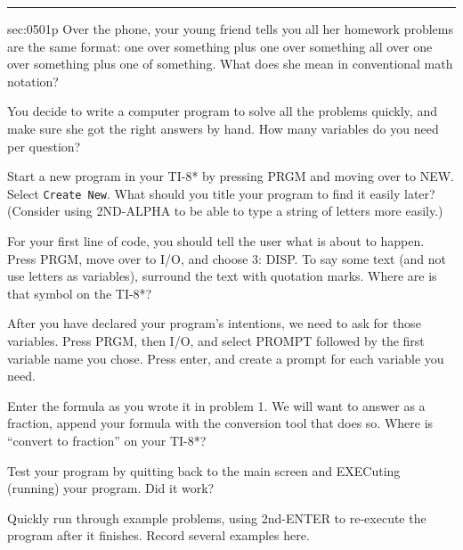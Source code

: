 \renewcommand{\columnseprule}{1.5pt}
\begin{multicols*}{2}
\rule[0.5\baselineskip]{0.4\textwidth}{1pt}
\noindent
{}\label{sec:0501p}
\begin{exercises}{sec:0501p}
\lab{} Over the phone, your young friend tells you all her homework problems are the same format: one over something plus one over something all over one over something plus one of something.  What does she mean in conventional math notation?

\vspace{2cm}
\lab{} You decide to write a computer program to solve all the problems quickly, and make sure she got the right answers by hand.  How many variables do you need per question?

\vspace{2cm}
\lab{} Start a new program in your TI-8* by pressing PRGM and moving over to NEW.  Select \texttt{Create New}.  What should you title your program to find it easily later?  (Consider using 2ND-ALPHA to be able to type a string of letters more easily.)

\vspace{2cm}
\lab{} For your first line of code, you should tell the user what is about to happen.  Press PRGM, move over to I/O, and choose 3: DISP.  To say some text (and not use letters as variables), surround the text with quotation marks.  Where are is that symbol on the TI-8*?

\vspace{2cm}
\lab{} After you have declared your program’s intentions, we need to ask for those variables.  Press PRGM, then I/O, and select PROMPT followed by the first variable name you chose.  Press enter, and create a prompt for each variable you need.

\vspace{2cm}
\lab{} Enter the formula as you wrote it in problem 1.  We will want to answer as a fraction, append your formula with the conversion tool that does so.  Where is ``convert to fraction'' on your TI-8*?

\vspace{2cm}
\lab{} Test your program by quitting back to the main screen and EXECuting (running) your program.  Did it work?

\vspace{2cm}
\lab{} Quickly run through example problems, using 2nd-ENTER to re-execute the program after it finishes.  Record several examples here.


\end{exercises}
\end{multicols*}
